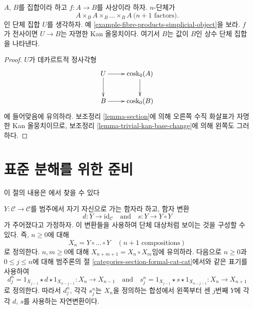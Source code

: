 \begin{lemma}
\label{lemma-cosk-minus-one-equivalence}
$A$, $B$를 집합이라 하고 $f : A \to B$를 사상이라 하자.
$n$-단체가
$$
A \times_B A \times_B \ldots \times_B A\ (n + 1 \text{ factors)}.
$$
인 단체 집합 $U$를 생각하자. 예
\ref{example-fibre-products-simplicial-object}을 보라. $f$가 전사이면
$U \to B$는 자명한 Kan 올뭉치이다. 여기서 $B$는 값이 $B$인 상수
단체 집합을 나타낸다.
\end{lemma}

\begin{proof}
$U$가 데카르트적 정사각형
$$
\xymatrix{
U \ar[d] \ar[r] & \text{cosk}_0(A) \ar[d] \\
B \ar[r] & \text{cosk}_0(B)
}
$$
에 들어맞음에 유의하라. 보조정리 \ref{lemma-section}에 의해 오른쪽
수직 화살표가 자명한 Kan 올뭉치이므로, 보조정리
\ref{lemma-trivial-kan-base-change}에 의해 왼쪽도 그러하다.
\end{proof}











\section{표준 분해를 위한 준비}
\label{section-standard-pre}

\noindent
이 절의 내용은 \cite[부록 1]{Godement}에서 찾을 수 있다

\begin{example}
\label{example-godement}
$Y : \mathcal{C} \to \mathcal{C}$를 범주에서 자기 자신으로 가는
함자라 하고, 함자 변환
$$
d : Y \longrightarrow \text{id}_\mathcal{C}
\quad\text{and}\quad
s : Y \longrightarrow Y \circ Y
$$
가 주어졌다고 가정하자. 이 변환들을 사용하여 단체 대상처럼 보이는
것을 구성할 수 있다. 즉, $n \geq 0$에 대해
$$
X_n = Y \circ \ldots \circ Y \quad (n + 1\text{ compositions})
$$
로 정의한다. $n, m \geq 0$에 대해
$X_{n + m + 1} = X_n \circ X_m$임에 유의하라. 다음으로 $n \geq 0$과
$0 \leq j \leq n$에 대해 범주론의 절
\ref{categories-section-formal-cat-cat}에서와 같은 표기를 사용하여
$$
d^n_j = 1_{X_{j - 1}} \star d \star 1_{X_{n - j - 1}} :
X_n
\to
X_{n - 1}
\quad\text{and}\quad
s^n_j = 1_{X_{j - 1}} \star s \star 1_{X_{n - j - 1}} :
X_n
\to
X_{n + 1}
$$
로 정의한다. 따라서 $d^n_j$, 각각 $s^n_j$는 $X_n$을 정의하는 합성에서
왼쪽부터 센 $j$번째 $Y$에 각각 $d$, $s$를 사용하는 자연변환이다.
\end{example}

